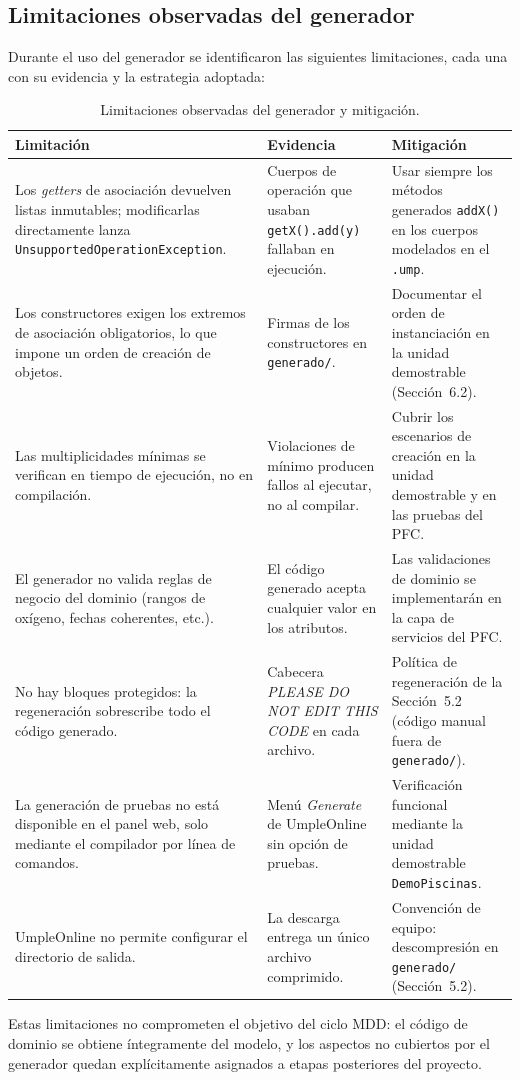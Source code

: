 \subsection{Limitaciones observadas del generador}

Durante el uso del generador se identificaron las siguientes
limitaciones, cada una con su evidencia y la estrategia adoptada:

\begin{table}[h]
  \centering
  \caption{Limitaciones observadas del generador y mitigación.}
  \begin{tabular}{|p{4.2cm}|p{4.6cm}|p{4.6cm}|}
    \hline
    \textbf{Limitación} & \textbf{Evidencia} & \textbf{Mitigación} \\
    \hline
    Los \emph{getters} de asociación devuelven listas inmutables;
    modificarlas directamente lanza
    \texttt{UnsupportedOperationException}. &
    Cuerpos de operación que usaban
    \texttt{getX().add(y)} fallaban en ejecución. &
    Usar siempre los métodos generados \texttt{addX()} en los cuerpos
    modelados en el \texttt{.ump}. \\
    \hline
    Los constructores exigen los extremos de asociación obligatorios,
    lo que impone un orden de creación de objetos. &
    Firmas de los constructores en
    \texttt{generado/}. &
    Documentar el orden de instanciación en la unidad demostrable
    (Sección~6.2). \\
    \hline
    Las multiplicidades mínimas se verifican en tiempo de ejecución,
    no en compilación. &
    Violaciones de mínimo producen fallos al ejecutar, no al
    compilar. &
    Cubrir los escenarios de creación en la unidad demostrable y en
    las pruebas del PFC. \\
    \hline
    El generador no valida reglas de negocio del dominio (rangos de
    oxígeno, fechas coherentes, etc.). &
    El código generado acepta cualquier valor en los atributos. &
    Las validaciones de dominio se implementarán en la capa de
    servicios del PFC. \\
    \hline
    No hay bloques protegidos: la regeneración sobrescribe todo el
    código generado. &
    Cabecera \emph{PLEASE DO NOT EDIT THIS CODE} en cada archivo. &
    Política de regeneración de la Sección~5.2 (código manual fuera
    de \texttt{generado/}). \\
    \hline
    La generación de pruebas no está disponible en el panel web,
    solo mediante el compilador por línea de comandos. &
    Menú \emph{Generate} de UmpleOnline sin opción de pruebas. &
    Verificación funcional mediante la unidad demostrable
    \texttt{DemoPiscinas}. \\
    \hline
    UmpleOnline no permite configurar el directorio de salida. &
    La descarga entrega un único archivo comprimido. &
    Convención de equipo: descompresión en \texttt{generado/}
    (Sección~5.2). \\
    \hline
  \end{tabular}
\end{table}

Estas limitaciones no comprometen el objetivo del ciclo MDD: el
código de dominio se obtiene íntegramente del modelo, y los aspectos
no cubiertos por el generador quedan explícitamente asignados a
etapas posteriores del proyecto.

